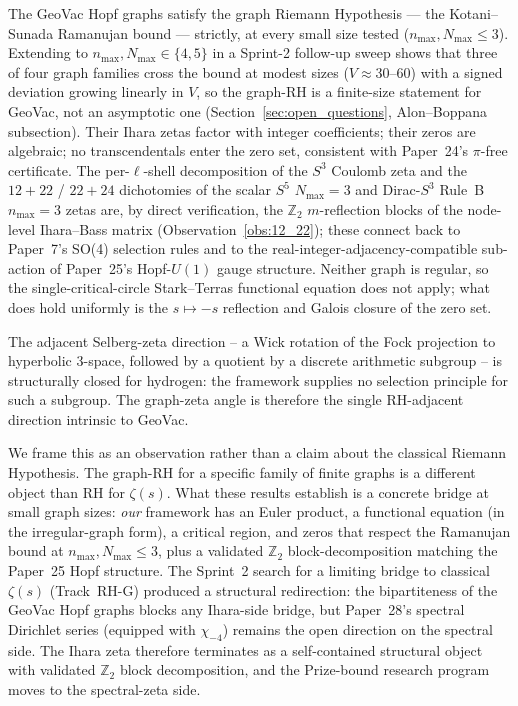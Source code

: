 \documentclass[11pt]{article}
\begin{document}
The GeoVac Hopf graphs satisfy the graph Riemann Hypothesis --- the
Kotani--Sunada Ramanujan bound --- strictly, at every small size
tested ($n_{\max},N_{\max}\le 3$).  Extending to $n_{\max},N_{\max}
\in\{4,5\}$ in a Sprint-2 follow-up sweep shows that three of four
graph families cross the bound at modest sizes
($V\approx 30$--$60$) with a signed deviation growing linearly in $V$,
so the graph-RH is a finite-size statement for GeoVac, not an
asymptotic one (Section~\ref{sec:open_questions}, Alon--Boppana
subsection).  Their Ihara zetas factor with integer coefficients; their
zeros are algebraic; no transcendentals enter the zero set, consistent
with Paper~24's $\pi$-free certificate.  The per-$\ell$-shell
decomposition of the $S^3$ Coulomb zeta and the $12+22$ / $22+24$
dichotomies of the scalar $S^5$ $N_{\max}=3$ and Dirac-$S^3$ Rule~B
$n_{\max}=3$ zetas are, by direct verification, the $\mathbb{Z}_2$
$m$-reflection blocks of the node-level Ihara--Bass matrix
(Observation~\ref{obs:12_22}); these connect back to Paper~7's SO(4)
selection rules and to the real-integer-adjacency-compatible
sub-action of Paper~25's Hopf-$U(1)$ gauge structure.  Neither graph
is regular, so the single-critical-circle Stark--Terras functional
equation does not apply; what does hold uniformly is the
$s\mapsto -s$ reflection and Galois closure of the zero set.

The adjacent Selberg-zeta direction -- a Wick rotation of the Fock
projection to hyperbolic 3-space, followed by a quotient by a
discrete arithmetic subgroup -- is structurally closed for hydrogen:
the framework supplies no selection principle for such a subgroup.
The graph-zeta angle is therefore the single RH-adjacent direction
intrinsic to GeoVac.

We frame this as an observation rather than a claim about the
classical Riemann Hypothesis.  The graph-RH for a specific family
of finite graphs is a different object than RH for $\zeta(s)$.  What
these results establish is a concrete bridge at small graph sizes:
\emph{our} framework has an Euler product, a functional equation (in
the irregular-graph form), a critical region, and zeros that respect
the Ramanujan bound at $n_{\max},N_{\max}\le 3$, plus a validated
$\mathbb{Z}_2$ block-decomposition matching the Paper~25 Hopf
structure.  The Sprint~2 search for a limiting bridge to classical
$\zeta(s)$ (Track~RH-G) produced a structural redirection: the
bipartiteness of the GeoVac Hopf graphs blocks any Ihara-side bridge,
but Paper~28's spectral Dirichlet series (equipped with
$\chi_{-4}$) remains the open direction on the spectral side.  The
Ihara zeta therefore terminates as a self-contained structural object
with validated $\mathbb{Z}_2$ block decomposition, and the Prize-bound
research program moves to the spectral-zeta side.
\end{document}
